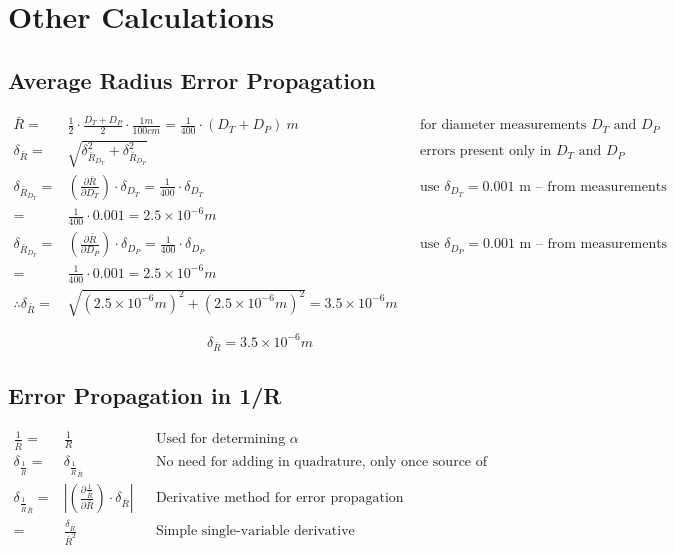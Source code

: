 \documentclass[12pt]{article}
\newcommand{\paren}[1]{\left( {#1} \right)}
\newcommand{\abs}[1]{\left| {#1} \right|}
\begin{document}
\clearpage

\section{Other Calculations}
\subsection{Average Radius Error Propagation} \label{sec:RadiusErr}

\begin{align*}
	\bar{R} =& \frac{1}{2}\cdot\frac{D_T + D_P}{2}\cdot\frac{1 m}{100 cm} = \frac{1}{400}\cdot(D_T + D_P)\ m && \text{for diameter measurements }D_T \text{ and }D_P \\
	\delta_{\bar{R}} =& \sqrt{\delta_{\bar{R}_{D_T}}^2 + \delta_{\bar{R}_{D_P}}^2} && \text{errors present only in }D_T \text{ and }D_P \\
	\delta_{\bar{R}_{D_T}} =& \left( \frac{\partial \bar{R}}{\partial D_T} \right)\cdot\delta_{D_T} = \frac{1}{400}\cdot\delta_{D_T} && \text{use }\delta_{D_T}=0.001\text{ m -- from measurements} \\
	=& \frac{1}{400}\cdot0.001=2.5\times10^{-6} m \\
	\delta_{\bar{R}_{D_T}} =& \left( \frac{\partial \bar{R}}{\partial D_P} \right)\cdot\delta_{D_P} = \frac{1}{400}\cdot\delta_{D_P} && \text{use }\delta_{D_P}=0.001\text{ m -- from measurements} \\
	=& \frac{1}{400}\cdot0.001=2.5\times10^{-6} m \\
	\therefore \delta_{\bar{R}} =& \sqrt{(2.5\times10^{-6}m)^2+ (2.5\times10^{-6}m)^2} = 3.5\times10^{-6} m
\end{align*}

\begin{equation}
	\delta_{\bar{R}} = 3.5\times10^{-6} m
	\label{R_bar_err}
\end{equation}

\subsection{Error Propagation in 1/R} \label{sec:InvRadiusError}

\begin{align*}
	\frac{1}{\bar{R}}=& \frac{1}{R} && \text{Used for determining }\alpha \\
	\delta_{\frac{1}{\bar{R}}} =& \delta_{\frac{1}{\bar{R}}_{\bar{R}}} && \text{No need for adding in quadrature, only once source of error} \\
	\delta_{\frac{1}{\bar{R}}_{\bar{R}}} =& \abs{\paren{\frac{\partial \frac{1}{\bar{R}}}{\partial \bar{R}}}\cdot\delta_{\bar{R}}} && \text{Derivative method for error propagation} \\
	=& \frac{\delta_{\bar{R}}}{\bar{R}^2} && \text{Simple single-variable derivative}
\end{align*}
\end{document}
